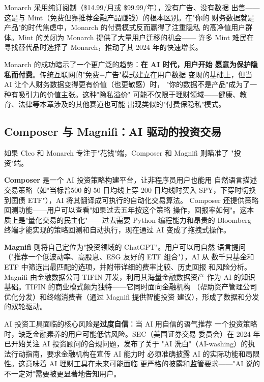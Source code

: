 Monarch 采用纯订阅制（\$14.99/月或 \$99.99/年），没有广告、没有数据
出售——这是与 Mint（免费但靠推荐金融产品赚钱）的根本区别。在"你的
财务数据就是产品"的时代焦虑中，Monarch 的付费模式反而赢得了注重隐私
的高净值用户群体。Mint 的关闭为 Monarch 提供了大量用户迁移的机会——
许多 Mint 难民在寻找替代品时选择了 Monarch，推动了其 2024 年的快速增长。

Monarch 的成功暗示了一个更广泛的趋势：\textbf{在 AI 时代，用户开始
愿意为保护隐私而付费}。传统互联网的"免费+广告"模式建立在用户数据
变现的基础上，但当 AI 让个人财务数据变得更有价值（也更敏感）时，
"你的数据不是产品"成为了一种有吸引力的价值主张。这种"隐私溢价"
可能不仅限于理财领域——健康、教育、法律等本章涉及的其他赛道也可能
出现类似的"付费保隐私"模式。


\subsection{Composer 与 Magnifi：AI 驱动的投资交易}
\label{subsec:composer-magnifi}

如果 Cleo 和 Monarch 专注于"花钱"端，Composer 和 Magnifi 则瞄准了
"投资"端。

\textbf{Composer} 是一个 AI 投资策略构建平台，让非程序员用户也能用
自然语言描述交易策略（如"当标普500 的 50 日均线上穿 200 日均线时买入
SPY，下穿时切换到国债 ETF"），AI 将其翻译成可执行的自动化交易算法。
Composer 还提供策略回测功能——用户可以查看"如果过去五年按这个策略
操作，回报率如何"。这本质上是"量化交易的民主化"——过去需要 Python
编程能力和昂贵的 Bloomberg 终端才能实现的策略回测和自动执行，现在通过
AI 变成了拖拽式操作。

\textbf{Magnifi} 则将自己定位为"投资领域的 ChatGPT"。用户可以用自然
语言提问（"推荐一个低波动率、高股息、ESG 友好的 ETF 组合"），AI 从
数千只基金和 ETF 中筛选出最匹配的选项，并附带详细的费率比较、历史回报
和风险分析。Magnifi 由金融数据公司 TIFIN 开发，利用其海量金融数据资产
作为 AI 的知识基础。TIFIN 的商业模式颇为独特——它同时面向金融机构
（帮助资产管理公司优化分发）和终端消费者（通过 Magnifi 提供智能投资
建议），形成了数据和分发的双轮驱动。

AI 投资工具面临的核心风险是\textbf{过度自信}：当 AI 用自信的语气推荐
一个投资策略时，缺乏金融素养的用户可能低估风险。SEC（美国证券交易
委员会）在 2024 年已开始关注 AI 投资顾问的合规问题，发布了关于
"AI 洗白"（AI-washing）的执法行动指南，要求金融机构在宣传 AI 能力时
必须准确披露 AI 的实际功能和局限性。这意味着 AI 理财工具在未来可能面临
更严格的披露和监管要求——"AI 说的不一定对"需要被更显著地告知用户。

